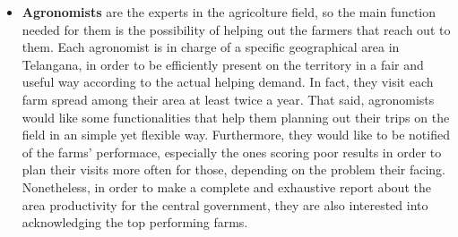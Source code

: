 \documentclass[table, 12pt]{article}
\begin{document}
\begin{itemize}
    \item \textbf{Agronomists} are the experts in the agricolture field, so the main function needed for them is the possibility of helping out the farmers that reach out to them. Each agronomist is in charge of a specific geographical area in Telangana, in order to be efficiently present on the territory in a fair and useful way according to the actual helping demand. In fact, they visit each farm spread among their area at least twice a year. That said, agronomists would like some functionalities that help them planning out their trips on the field in an simple yet flexible way. Furthermore, they would like to be notified of the farms' performace, especially the ones scoring poor results in order to plan their visits more often for those, depending on the problem their facing. Nonetheless, in order to make a complete and exhaustive report about the area productivity for the central government, they are also interested into acknowledging the top performing farms. %
\end{itemize}
\end{document}
